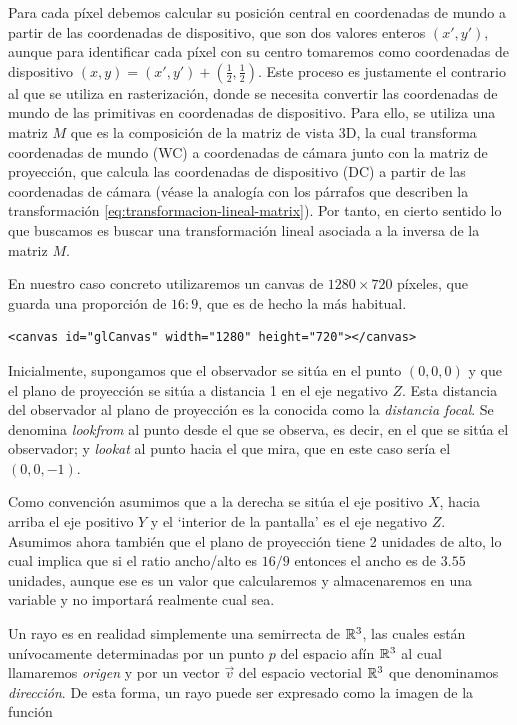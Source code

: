Para cada píxel debemos calcular su posición central en coordenadas de mundo a partir de las coordenadas de dispositivo, que son dos valores enteros $(x',y')$, aunque para identificar cada píxel con su centro tomaremos como coordenadas de dispositivo $(x,y)=(x',y')+\left(\frac 1 2, \frac 1 2\right)$. Este proceso es justamente el contrario al que se utiliza en rasterización, donde se necesita convertir las coordenadas de mundo de las primitivas en coordenadas de dispositivo. Para ello, se utiliza una matriz $M$ que es la composición de la matriz de vista 3D, la cual transforma coordenadas de mundo (WC) a coordenadas de cámara junto con la matriz de proyección, que calcula las coordenadas de dispositivo (DC) a partir de las coordenadas de cámara (véase la analogía con los párrafos que describen la transformación \ref{eq:transformacion-lineal-matrix}). Por tanto, en cierto sentido lo que buscamos es buscar una transformación lineal asociada a la inversa de la matriz $M$.

En nuestro caso concreto utilizaremos un canvas de $1280\times 720$ píxeles, que guarda una proporción de $16:9$, que es de hecho la más habitual.

\begin{lstlisting}
<canvas id="glCanvas" width="1280" height="720"></canvas>
\end{lstlisting}

Inicialmente, supongamos que el observador se sitúa en el punto $(0,0,0)$ y que el plano de proyección se sitúa a distancia 1 en el eje negativo $Z$. Esta distancia del observador al plano de proyección es la conocida como la \textit{distancia focal}. Se denomina \textit{lookfrom} al punto desde el que se observa, es decir, en el que se sitúa el observador; y \textit{lookat} al punto hacia el que mira, que en este caso sería el $(0,0,-1)$. 

Como convención asumimos que a la derecha se sitúa el eje positivo $X$, hacia arriba el eje positivo $Y$ y el `interior de la pantalla' es el eje negativo $Z$. Asumimos ahora también que el plano de proyección tiene 2 unidades de alto, lo cual implica que si el ratio ancho/alto es $16/9$ entonces el ancho es de $3.55$ unidades, aunque ese es un valor que calcularemos y almacenaremos en una variable y no importará realmente cual sea.

Un rayo es en realidad simplemente una semirrecta de $\mathbb{R}^3$, las cuales están unívocamente determinadas por un punto $p$ del espacio afín $\mathbb{R}^3$ al cual llamaremos \textit{origen} y por un vector $\vec v$ del espacio vectorial $\mathbb{R}^3$ que denominamos \textit{dirección}. De esta forma, un rayo puede ser expresado como la imagen de la función


